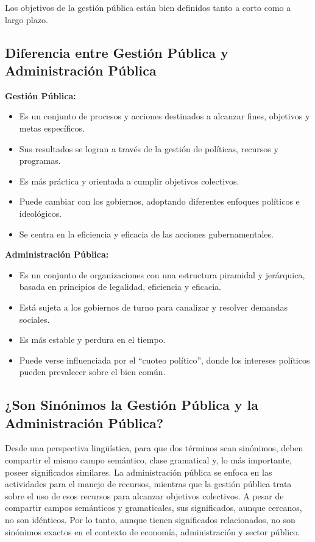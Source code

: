 \documentclass[
  jou,
  floatsintext,
  longtable,
  a4paper,
  nolmodern,
  notxfonts,
  notimes,
  12pt,
  colorlinks=true,linkcolor=blue,citecolor=blue,urlcolor=blue]{apa7}
\providecommand{\tightlist}{%
  \setlength{\itemsep}{0pt}\setlength{\parskip}{0pt}}
\begin{document}
Los objetivos de la gestión pública están bien definidos tanto a corto
como a largo plazo.

\subsection{Diferencia entre Gestión Pública y Administración
Pública}\label{diferencia-entre-gestiuxf3n-puxfablica-y-administraciuxf3n-puxfablica}

\textbf{Gestión Pública:}

\begin{itemize}
\tightlist
\item
  Es un conjunto de procesos y acciones destinados a alcanzar fines,
  objetivos y metas específicos.
\item
  Sus resultados se logran a través de la gestión de políticas, recursos
  y programas.
\item
  Es más práctica y orientada a cumplir objetivos colectivos.
\item
  Puede cambiar con los gobiernos, adoptando diferentes enfoques
  políticos e ideológicos.
\item
  Se centra en la eficiencia y eficacia de las acciones gubernamentales.
\end{itemize}

\textbf{Administración Pública:}

\begin{itemize}
\tightlist
\item
  Es un conjunto de organizaciones con una estructura piramidal y
  jerárquica, basada en principios de legalidad, eficiencia y eficacia.
\item
  Está sujeta a los gobiernos de turno para canalizar y resolver
  demandas sociales.
\item
  Es más estable y perdura en el tiempo.
\item
  Puede verse influenciada por el ``cuoteo político'', donde los
  intereses políticos pueden prevalecer sobre el bien común.
\end{itemize}

\subsection{¿Son Sinónimos la Gestión Pública y la Administración
Pública?}\label{son-sinuxf3nimos-la-gestiuxf3n-puxfablica-y-la-administraciuxf3n-puxfablica}

Desde una perspectiva lingüística, para que dos términos sean sinónimos,
deben compartir el mismo campo semántico, clase gramatical y, lo más
importante, poseer significados similares. La administración pública se
enfoca en las actividades para el manejo de recursos, mientras que la
gestión pública trata sobre el uso de esos recursos para alcanzar
objetivos colectivos. A pesar de compartir campos semánticos y
gramaticales, sus significados, aunque cercanos, no son idénticos. Por
lo tanto, aunque tienen significados relacionados, no son sinónimos
exactos en el contexto de economía, administración y sector público.
\end{document}
